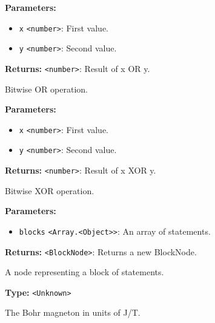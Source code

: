 \documentclass[12pt,a4paper]{article}
\begin{document}
\noindent \textbf{Parameters:}
\begin{itemize}
  \item \texttt{x} \texttt{<number>}: First value.
  \item \texttt{y} \texttt{<number>}: Second value.
\end{itemize}

\noindent \textbf{Returns:} \texttt{<number>}: Result of \textasciigrave{}x OR y\textasciigrave{}.

\noindent Bitwise OR operation.

\vspace{5mm}
\noindent {}


\noindent \textbf{Parameters:}
\begin{itemize}
  \item \texttt{x} \texttt{<number>}: First value.
  \item \texttt{y} \texttt{<number>}: Second value.
\end{itemize}

\noindent \textbf{Returns:} \texttt{<number>}: Result of \textasciigrave{}x XOR y\textasciigrave{}.

\noindent Bitwise XOR operation.

\vspace{5mm}
\noindent {}


\noindent \textbf{Parameters:}
\begin{itemize}
  \item \texttt{blocks} \texttt{<Array.<Object>>}: An array of statements.
\end{itemize}

\noindent \textbf{Returns:} \texttt{<BlockNode>}: Returns a new BlockNode.

\noindent A node representing a block of statements.

\vspace{5mm}
\noindent {}\vspace{4mm}


\noindent \textbf{Type:} \texttt{<Unknown>}

\noindent The Bohr magneton in units of \textasciigrave{}J/T\textasciigrave{}.
\end{document}
